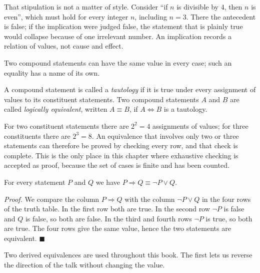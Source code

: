 That stipulation is not a matter of style. Consider ``if $n$ is divisible by $4$, then $n$
is even'', which must hold for every integer $n$, including $n=3$. There the
antecedent is false; if the implication were judged false, the statement that is plainly true would
collapse because of one irrelevant number. An implication records a relation of values, not
cause and effect.


Two compound statements can have the same value in every case; such an equality
has a name of its own.

\begin{definisi}
A compound statement is called a \emph{tautology} if it is true under every assignment
of values to its constituent statements. Two compound statements $A$ and $B$ are called
\emph{logically equivalent}, written $A \equiv B$, if $A \Leftrightarrow B$ is a tautology.
\end{definisi}

For two constituent statements there are $2^{2}=4$ assignments of values; for three constituents there are
$2^{3}=8$. An equivalence that involves only two or three statements can therefore be
proved by checking every row, and that check is complete. This is the only place in this chapter where
exhaustive checking is accepted as proof, because the set of cases is finite and
has been counted.

\begin{proposisi}
For every statement $P$ and $Q$ we have $P \Rightarrow Q \equiv \neg P \vee Q$.
\end{proposisi}
\par\smallskip\noindent\textit{Proof.} We compare the column $P \Rightarrow Q$ with the column $\neg P \vee Q$
in the four rows of the truth table. In the first row both are true. In the second row $\neg P$ is false and
$Q$ is false, so both are false. In the third and fourth rows $\neg P$ is true,
so both are true. The four rows give the same value, hence the two statements are
equivalent.
\hfill$\blacksquare${\parfillskip=0pt\par}

Two derived equivalences are used throughout this book. The first lets us reverse
the direction of the talk without changing the value.

